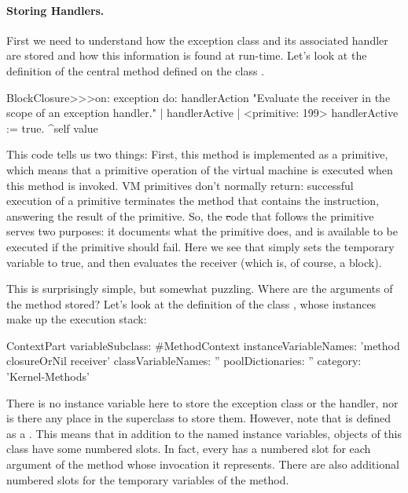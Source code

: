 \documentclass[a4paper,10pt,twoside]{book}
\begin{document}
\paragraph{Storing Handlers.}
First we need to understand how the exception class and its associated handler  are stored and how this information is found at run-time. 
Let's look at the definition of the central method  defined on the class . %

\begin{code}{}
BlockClosure>>>on: exception do: handlerAction 
	"Evaluate the receiver in the scope of an exception handler." 
	| handlerActive | 
	<primitive: 199> 
	handlerActive := true. 
	^self value 
\end{code}

This code tells us two things: First, this method is implemented as a primitive, which means that  a primitive operation of the virtual machine is executed when this method is invoked.  VM primitives don't normally return: successful execution of a primitive terminates the method that contains the  instruction, answering the result of the primitive.
So, the \st code that follows the primitive serves two purposes: it documents what the primitive does, and is available to be executed if the primitive should fail. 
Here we see that  simply sets the temporary variable  to true, and then evaluates the receiver (which is, of course, a block).  

This is surprisingly simple, but somewhat puzzling.  Where are the arguments of the  method stored?  Let's look at the definition of the class , whose instances make up the execution stack: 

\begin{code}{}
ContextPart variableSubclass: #MethodContext
	instanceVariableNames: 'method closureOrNil receiver'
	classVariableNames: ''
	poolDictionaries: ''
	category: 'Kernel-Methods'
\end{code}

There is no instance variable here to store the exception class or the handler, nor is there any place  in the superclass to store them. 
However, note that  is defined as a .
This means that in addition to the named instance variables, objects of this class have some numbered slots.  In fact, every  has a numbered slot for each  argument of the method whose invocation it represents.  There are also additional numbered slots for the temporary variables of the method.
\end{document}

